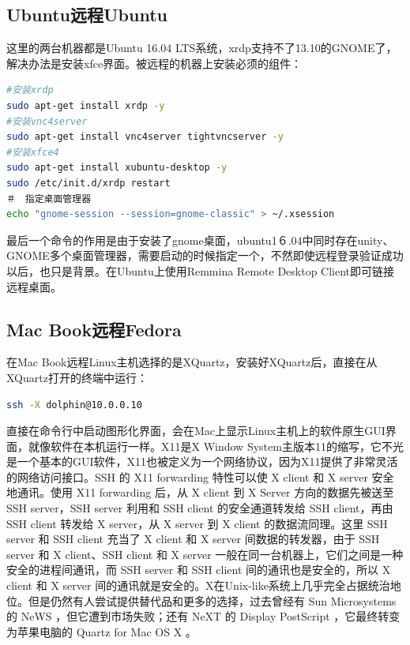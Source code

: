 \documentclass[letter]{book}
\begin{document}
\subsection{Ubuntu远程Ubuntu}

这里的两台机器都是Ubuntu 16.04 LTS系统，xrdp支持不了13.10的GNOME了，解决办法是安装xfce界面。被远程的机器上安装必须的组件：

\begin{lstlisting}[language=Bash]
#安装xrdp
sudo apt-get install xrdp -y
#安装vnc4server
sudo apt-get install vnc4server tightvncserver -y
#安装xfce4
sudo apt-get install xubuntu-desktop -y
sudo /etc/init.d/xrdp restart
＃　指定桌面管理器
echo "gnome-session --session=gnome-classic" > ~/.xsession
\end{lstlisting}

最后一个命令的作用是由于安装了gnome桌面，ubuntu1６.04中同时存在unity、GNOME多个桌面管理器，需要启动的时候指定一个，不然即使远程登录验证成功以后，也只是背景。在Ubuntu上使用Remmina Remote Desktop Client即可链接远程桌面。

\subsection{Mac Book远程Fedora}

在Mac Book远程Linux主机选择的是XQuartz，安装好XQuartz后，直接在从XQuartz打开的终端中运行：

\begin{lstlisting}[language=Bash]
ssh -X dolphin@10.0.0.10
\end{lstlisting}

直接在命令行中启动图形化界面，会在Mac上显示Linux主机上的软件原生GUI界面，就像软件在本机运行一样。X11是X Window System主版本11的缩写，它不光是一个基本的GUI软件，X11也被定义为一个网络协议，因为X11提供了非常灵活的网络访问接口。SSH 的 X11 forwarding 特性可以使 X client 和 X server 安全地通讯。使用 X11 forwarding 后，从 X client 到 X Server 方向的数据先被送至 SSH server，SSH server 利用和 SSH client 的安全通道转发给 SSH client，再由 SSH client 转发给 X server，从 X server 到 X client 的数据流同理。这里 SSH server 和 SSH client 充当了 X client 和 X server 间数据的转发器，由于 SSH server 和 X client、SSH client 和 X server 一般在同一台机器上，它们之间是一种安全的进程间通讯，而 SSH server 和 SSH client 间的通讯也是安全的，所以 X client 和 X server 间的通讯就是安全的。X在Unix-like系统上几乎完全占据统治地位。但是仍然有人尝试提供替代品和更多的选择，过去曾经有 Sun Microsystems 的 NeWS ，但它遭到市场失败；还有 NeXT 的 Display PostScript ，它最终转变为苹果电脑的 Quartz for Mac OS X 。
\end{document}
